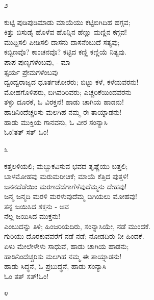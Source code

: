 \begin{center}
೨
\end{center}

\begin{myquote}
ಕುಟ್ಟಿ ಪುಡಿಪುಡಿಮಾಡು ಮಾಯೆಯು ಕಟ್ಟಿಬಿಗಿದಿಹ ಹಗ್ಗವ;\\ಕಿತ್ತು ಬಿಸುಡೈ ಹೊಳೆವ ಹೊನ್ನಿನ ಹೆಣ್ಣು ಮಣ್ಣಿನ ಕಗ್ಗವ!\\ಮುದ್ದಿಸಲಿ ಪೀಡಿಸಲಿ ದಾಸನು ದಾಸನೆಂಬುದೆ ಸತ್ಯವು;\\ಕಬ್ಬಿಣವೊ? ಕಾಂಚನವೊ? ಕಟ್ಟಿದ ಕಣ್ಣಿ ಕಣ್ಣಿಯೆ ನಿತ್ಯವು.\\ಪಾಪ ಪುಣ್ಯಗಳೆಂಬವು, - ಮಾ\\ತ್ಸರ್ಯ ಪ್ರೇಮಗಳೆಂಬವು\\ದ್ವಂದ್ವರಾಜ್ಯದ ಧೂರ್ತಚೋರರು; ಬಿಟ್ಟು ಕಳೆ, ಕಳೆಯವರನು!\\ಮೋಹಗೊಳಿಪರು, ಬಿಗಿವರಿರಿವರು; ಎಚ್ಚರಿಕೆಯಿಂದವರನು\\ತಳ್ಳು ದೂರಕೆ, ಓ ವಿರಕ್ತನೆ! ಹಾಡು ಚಾಗಿಯ ಹಾಡನು!\\ಹಾಡಿನಿಂದೆಚ್ಚರಿಸು ಮಲಗಿಹ ನಮ್ಮ ಈ ತಾಯ್ನಾಡನು!\\ಹಾಡು ಮುಕ್ತಿಯ ಗಾನವನು, ಓ ವೀರ ಸಂನ್ಯಾಸಿ\\ಓಂ!ತತ್ ಸತ್ ಓಂ!
\end{myquote}

\begin{center}
೩
\end{center}

\begin{myquote}
ಕತ್ತಲಳಿಯಲಿ; ಮಬ್ಬುಕವಿಸುವ ಭವದ ತೃಷ್ಣೆಯು ಬತ್ತಲಿ;\\ಬಾಳಮೋಹವು ಮರುಮರೀಚಿಕೆ; ಮಾಯೆ ಕೆತ್ತಿದ ಪುತ್ತಳಿ!\\ಜನನದೆಡೆಯಿಂ ಮರಣದೆಡೆಗಾಗೆಳೆವುದೆಮ್ಮನು ದೇಹವು!\\ಜನ್ಮ ಜನ್ಮದಿ ಮರಳಿ ಮರಳುವುದೆಮ್ಮ ಬಿಗಿಯಲು ಮೋಹವು!\\ತನ್ನ ಜಯಿಸಿದ ಶಕ್ತನು - ಅವ\\ನೆಲ್ಲ ಜಯಿಸಿದ ಮುಕ್ತನು!\\ಎಂಬುದನ್ನು ತಿಳಿ; ಹಿಂಜರಿಯದಿರು, ಸಂನ್ಯಾಸಿಯೇ, ನಡೆ ಮುಂದಕೆ.\\ಗುರಿಯು ದೊರಕುವವರೆಗೆ ನಡೆ ನಡೆ; ನೋಡದಿರು ನೀ ಹಿಂದಕೆ.\\ಏಳು ಮೇಲೇಳೇಳು ಸಾಧುವೆ, ಹಾಡು ಚಾಗಿಯ ಹಾಡನು;\\ಹಾಡಿನಿಂದೆಚ್ಚರಿಸು ಮಲಗಿಹ ನಮ್ಮ ಈ ತಾಯ್ನಾಡನು!\\ಹಾಡು ಸಿದ್ಧನೆ, ಓ ಪ್ರಬುದ್ಧನೆ, ಹಾಡು ಸಂನ್ಯಾಸಿ\\ಓಂ ತತ್ ಸತ್!ಓಂ!
\end{myquote}

\begin{center}
೪
\end{center}

